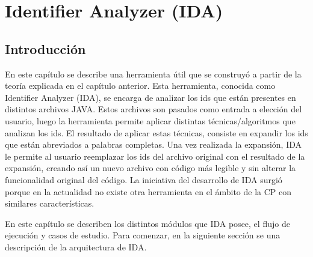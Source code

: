 \documentclass[a4paper,12pt]{report}
\renewcommand{\headrulewidth}{1pt}%
\begin{document}


\chapter{Identifier Analyzer (IDA)}
\fancyhf{}
\pagestyle{fancy}
\lhead[]{\leftmark}
\chead[]{}
\rhead[]{\thepage}
\renewcommand{\headrulewidth}{1pt}

\section{Introducción}

En este capítulo se describe una herramienta útil que se construyó a partir de la teoría explicada en el capítulo anterior. Esta herramienta, conocida como Identifier Analyzer (IDA), se encarga de analizar los ids que están presentes en distintos archivos JAVA. Estos archivos son pasados como entrada a elección del usuario, luego la herramienta permite aplicar distintas técnicas/algoritmos que analizan los ids. El resultado de aplicar estas técnicas, consiste en expandir los ids que están abreviados a palabras completas. Una vez realizada la expansión, IDA le permite al usuario reemplazar los ids del archivo original con el resultado de la expansión, creando así un nuevo archivo con código más legible y sin alterar la funcionalidad original del código. La iniciativa del desarrollo de IDA surgió porque en la actualidad no existe otra herramienta en el ámbito de la CP con similares características.

En este capítulo se describen los distintos módulos que IDA posee, el flujo de ejecución y casos de estudio. Para comenzar, en la siguiente sección se  una descripción de la arquitectura de IDA.
\end{document}
